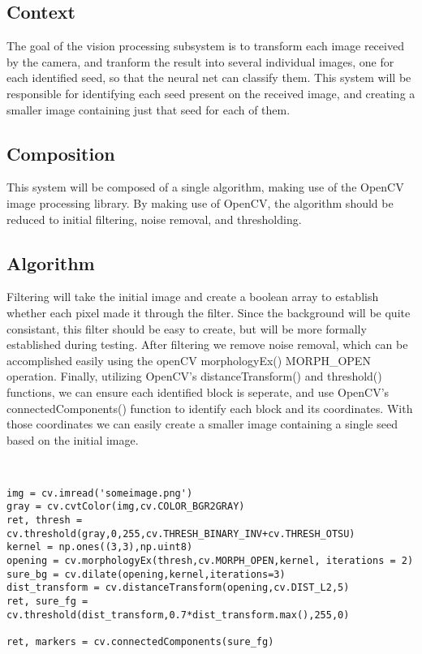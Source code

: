 
\subsection{Context}

The goal of the vision processing subsystem is to transform each image received by the camera, and tranform the result into several
individual images, one for each identified seed, so that the neural net can classify them. 
This system will be responsible for identifying each seed present on the received image,
and creating a smaller image containing just that seed for each of them.

\subsection{Composition} 

This system will be composed of a single algorithm, making use of the OpenCV image processing library.
By making use of OpenCV, the algorithm should be reduced to initial filtering, noise removal, and thresholding.

\subsection{Algorithm}
Filtering will take the initial image and create a boolean array to establish whether each pixel made it through the filter.
Since the background will be quite consistant, this filter should be easy to create, but will be more formally established during testing.
After filtering we remove noise removal, which can be accomplished easily using the openCV morphologyEx() MORPH_OPEN operation.
Finally, utilizing OpenCV's distanceTransform() and threshold() functions, we can ensure each identified block is seperate, and use OpenCV's connectedComponents() function to identify each block and its coordinates. With those coordinates we can easily create a smaller image containing a single seed based on the initial image.

\begin{verbatim}


img = cv.imread('someimage.png')
gray = cv.cvtColor(img,cv.COLOR_BGR2GRAY)
ret, thresh = cv.threshold(gray,0,255,cv.THRESH_BINARY_INV+cv.THRESH_OTSU)
kernel = np.ones((3,3),np.uint8)
opening = cv.morphologyEx(thresh,cv.MORPH_OPEN,kernel, iterations = 2)
sure_bg = cv.dilate(opening,kernel,iterations=3)
dist_transform = cv.distanceTransform(opening,cv.DIST_L2,5)
ret, sure_fg = cv.threshold(dist_transform,0.7*dist_transform.max(),255,0)

ret, markers = cv.connectedComponents(sure_fg)
\end{verbatim}



